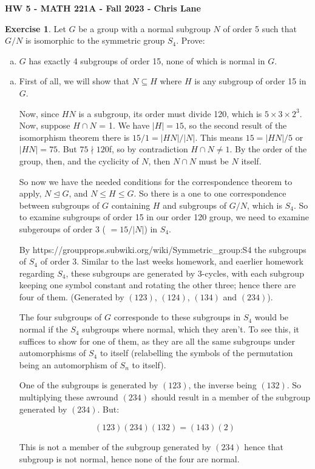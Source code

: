 \documentclass[11pt,oneside]{article}
\numberwithin{equation}{section}
\theoremstyle{definition}
\newtheorem{exercise}{Exercise}
\begin{document}
\textbf{HW 5 - MATH 221A - Fall 2023 - Chris Lane}


\begin{exercise}
  Let $G$ be a group with a normal subgroup $N$ of order 5 such that
  $G/N$ is isomorphic to the symmetric group $S_4$. Prove:
  \begin{enumerate}[(c)]
    \item
    $G$ has exactly 4 subgroups of order 15, none of which is normal in $G$.  
  \end{enumerate}
\end{exercise}
\begin{solution}
  \begin{enumerate}[(c)]
  \item
    First of all, we will show that $N \subseteq H$ where $H$ is any
    subgroup of order 15 in $G$.
    
    Now, since $ HN$ is a subgroup, its order must divide 120, which
    is $5 \times 3 \times 2 ^3$.  Now, suppose $ H \cap N$ = {1}.  We
    have $|H| = 15$, so the second result of the isomorphism theorem
    there is $15 / 1 = |HN| / |N|$.  This means $15 = |HN| / 5$ or
    $|HN| = 75$.  But $75 \nmid 120$f, so by
    contradiction $ H \cap N \neq {1}$.  By the order of the group,
    then, and the cyclicity of $N$, then $N \cap N$ must be $N$ itself.

    So now we have the needed conditions for the correspondence
    theorem to apply, $ N \trianglelefteq G$, and $N \leq H \leq G$.
    So there is a one to one correspondence between subgroups of $G$
    containing $H$ and subgroups of $G/N$, which is $S_4$.  So to
    examine subgroups of order 15 in our order 120 group, we need
    to examine subgeroups of order 3 ( $= 15 / |N|$) in $S_4$.  

    By https://groupprops.subwiki.org/wiki/Symmetric\_group:S4 the
    subgroups of $S_4$ of order $3$.  Similar to the last weeks
    homework, and eaerlier homework regarding $S_4$, these subgroups
    are generated by 3-cycles, with each subgroup keeping one symbol
    constant and rotating the other three; hence there are four of
    them. (Generated by $(1 2 3)$, $(1 2 4)$, $(1 3 4)$ and $(2 3 4)$).

    The four subgroups of $G$ corresponde to these subgroups in $S_4$
    would be normal if the $S_4$ subgroups where normal, which they
    aren't.  To see this, it suffices to show for one of them, as they
    are all the same subgroups under automorphisms of $S_4$ to itself
    (relabelling the symbols of the permutation being an automorphism
    of $S_n$ to itself).

    One of the subgroups is generated by $(1 2 3)$, the inverse being
    $(1 3 2)$.  So multiplying these awround $(2 3 4)$ should result
    in a member of the subgroup generated by $(2 3 4)$.  But:

    $$
    (1 2 3)(2 3 4)(1 3 2) = (1 4 3)(2)
    $$

    This is not a member of the subgroup generated by $(2 3 4)$ hence
    that subgroup is not normal, hence none of the four are normal.
  \end{enumerate}
\end{solution}
\end{document}
